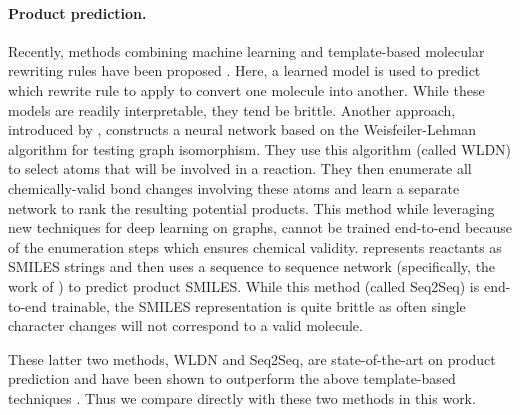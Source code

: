 \paragraph{Product prediction.}
Recently, methods combining machine learning and template-based molecular rewriting rules have been proposed \citep{coley2017prediction,neural-symbolic,segler2018planning,wei2016neural,zhang2005structure}.
 Here, a learned model is used to predict which rewrite rule to apply to convert one molecule into another. While these models are readily interpretable, they tend be brittle. 
Another approach, introduced by \cite{jin2017predicting}, constructs a neural network based on the Weisfeiler-Lehman algorithm for testing graph isomorphism. They use this algorithm (called WLDN) to select atoms that will be involved in a reaction. They then enumerate all chemically-valid bond changes involving these atoms and learn a separate network to rank the resulting potential products. This method while leveraging new techniques for deep learning on graphs, cannot be trained end-to-end because of the enumeration steps which ensures chemical validity.
\cite{schwaller2017found} represents reactants as SMILES \citep{weininger1988smiles} strings and then uses a sequence to sequence network (specifically, the work of \citet{Zhao2017}) to predict product SMILES. While this method (called Seq2Seq) is end-to-end trainable, the SMILES representation is quite brittle as often single character changes will not correspond to a valid molecule.

 These latter two methods, WLDN and Seq2Seq, are state-of-the-art on product prediction and have been shown to outperform the above template-based techniques \citep{jin2017predicting}. Thus we compare directly with these two methods in this work.


